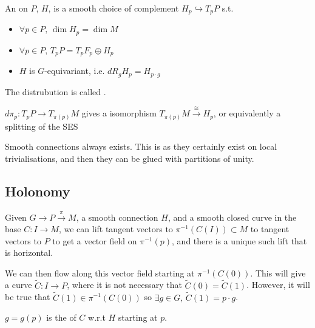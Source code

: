\documentclass{article}
\begin{document}
\begin{definition}
An  on $P$, $H$, is a smooth choice of complement $H_p \hookrightarrow T_pP$ s.t. 
\begin{itemize}
    \item $\forall p \in P, \, \dim H_p = \dim M$ 
    \item $\forall p \in P, \, T_pP = T_p F_p \oplus H_p$
    \item $H$ is $G$-equivariant, i.e. $dR_g H_p = H_{p \cdot g}$
\end{itemize}
The distrubution is called .
\end{definition}

\begin{remark}
$d\pi_p : T_p P \to T_{\pi(p)}M$ gives a isomorphism $T_{\pi(p)} M \overset{\cong}{\to} H_p$, or equivalently a splitting of the SES
\end{remark}

\begin{remark}
Smooth connections always exists. This is as they certainly exist on local trivialisations, and then they can be glued with partitions of unity. 
\end{remark}



\subsection{Holonomy}

\begin{lemma}
Given $G \to P \overset{\pi}{\to} M$, a smooth connection $H$, and a smooth closed curve in the base $C: I \to M$, we can lift tangent vectors to $\pi^{-1}(C(I)) \subset M$ to tangent vectors to $P$ to get a vector field on $\pi^{-1}(p)$, and there is a unique such lift that is horizontal.
\end{lemma}
We can then flow along this vector field starting at $\pi^{-1}(C(0))$. This will give a curve $\tilde{C}:I \to P$, where it is not necessary that $\tilde{C}(0) = \tilde{C}(1)$. However, it will be true that $\tilde{C}(1) \in \pi^{-1}(C(0))$ so $\exists g \in G, \, \tilde{C}(1) = p \cdot g$. 

\begin{definition}
$g =g(p)$ is the  of $C$ w.r.t $H$ starting at $p$.  
\end{definition}
\end{document}

